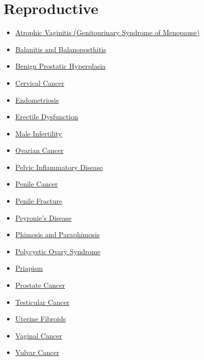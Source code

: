 \section*{Reproductive}
\label{sec:organ_reproductive}
\begin{itemize}[noitemsep]
  \item \hyperlink{sec:Atrophic Vaginitis}{Atrophic Vaginitis (Genitourinary Syndrome of Menopause)}
  \item \hyperlink{sec:Balanitis and Balanoposthitis}{Balanitis and Balanoposthitis}
  \item \hyperlink{sec:Benign Prostatic Hyperplasia}{Benign Prostatic Hyperplasia}
  \item \hyperlink{sec:Cervical Cancer}{Cervical Cancer}
  \item \hyperlink{sec:Endometriosis}{Endometriosis}
  \item \hyperlink{sec:Erectile Dysfunction}{Erectile Dysfunction}
  \item \hyperlink{sec:Male Infertility}{Male Infertility}
  \item \hyperlink{sec:Ovarian Cancer}{Ovarian Cancer}
  \item \hyperlink{sec:Pelvic Inflammatory Disease}{Pelvic Inflammatory Disease}
  \item \hyperlink{sec:Penile Cancer}{Penile Cancer}
  \item \hyperlink{sec:Penile Fracture}{Penile Fracture}
  \item \hyperlink{sec:Peyronie's Disease}{Peyronie's Disease}
  \item \hyperlink{sec:Phimosis and Paraphimosis}{Phimosis and Paraphimosis}
  \item \hyperlink{sec:Polycystic Ovary Syndrome}{Polycystic Ovary Syndrome}
  \item \hyperlink{sec:Priapism}{Priapism}
  \item \hyperlink{sec:Prostate Cancer}{Prostate Cancer}
  \item \hyperlink{sec:Testicular Cancer}{Testicular Cancer}
  \item \hyperlink{sec:Uterine Fibroids}{Uterine Fibroids}
  \item \hyperlink{sec:Vaginal Cancer}{Vaginal Cancer}
  \item \hyperlink{sec:Vulvar Cancer}{Vulvar Cancer}
\end{itemize}

